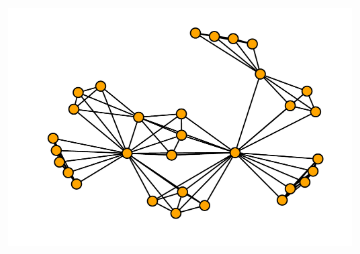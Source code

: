 \documentclass{article}
\begin{document}
\begin{figure}[!hbtp]
\begin{subfigure}{0.3\textwidth}
    \end{subfigure}
    \begin{subfigure}{0.3\textwidth}
        \includegraphics[width=\textwidth]{./assets/images/coauthor08.pdf}
    \end{subfigure}
\end{figure}



\end{document}
